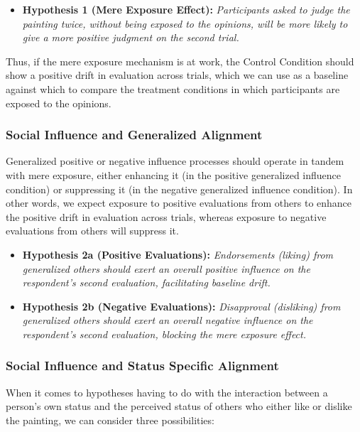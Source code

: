 \documentclass[12pt, letterpaper]{article}
\begin{document}
\begin{itemize}
    \item \textbf{Hypothesis 1 (Mere Exposure Effect):} \textit{Participants asked to judge the painting twice, without being exposed to the opinions, will be more likely to give a more positive judgment on the second trial.}
\end{itemize}

Thus, if the mere exposure mechanism is at work, the Control Condition should show a positive drift in evaluation across trials, which we can use as a baseline against which to compare the treatment conditions in which participants are exposed to the opinions. 

\subsubsection{Social Influence and Generalized Alignment}

Generalized positive or negative influence processes should operate in tandem with mere exposure, either enhancing it (in the positive generalized influence condition) or suppressing it (in the negative generalized influence condition). In other words, we expect exposure to positive evaluations from others to enhance the positive drift in evaluation across trials, whereas exposure to negative evaluations from others will suppress it.

\begin{itemize}
    \item \textbf{Hypothesis 2a (Positive Evaluations):} \textit{Endorsements (liking) from generalized others should exert an overall positive influence on the respondent's second evaluation, facilitating baseline drift.}
    \item \textbf{Hypothesis 2b (Negative Evaluations):} \textit{Disapproval (disliking) from generalized others should exert an overall negative influence on the respondent's second evaluation, blocking the mere exposure effect.}
\end{itemize}

\subsubsection{Social Influence and Status Specific Alignment}

When it comes to hypotheses having to do with the interaction between a person's own status and the perceived status of others who either like or dislike the painting, we can consider three possibilities:
\end{document}
